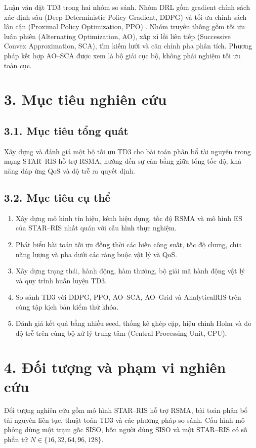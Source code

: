 Luận văn đặt TD3 trong hai nhóm so sánh. Nhóm DRL gồm gradient chính sách xác định sâu (Deep Deterministic Policy Gradient, DDPG) \cite{Lillicrap2015DDPG} và tối ưu chính sách lân cận (Proximal Policy Optimization, PPO) \cite{Meng2024PPOSTARRSMA}. Nhóm truyền thống gồm tối ưu luân phiên (Alternating Optimization, AO), xấp xỉ lồi liên tiếp (Successive Convex Approximation, SCA), tìm kiếm lưới và căn chỉnh pha phân tích. Phương pháp kết hợp AO--SCA được xem là bộ giải cục bộ, không phải nghiệm tối ưu toàn cục.

\section*{3. Mục tiêu nghiên cứu}
\subsection*{3.1. Mục tiêu tổng quát}
Xây dựng và đánh giá một bộ tối ưu TD3 cho bài toán phân bổ tài nguyên trong mạng STAR--RIS hỗ trợ RSMA, hướng đến sự cân bằng giữa tổng tốc độ, khả năng đáp ứng QoS và độ trễ ra quyết định.

\subsection*{3.2. Mục tiêu cụ thể}
\begin{enumerate}[label=\arabic*)]
  \item Xây dựng mô hình tín hiệu, kênh hiệu dụng, tốc độ RSMA và mô hình ES của STAR--RIS nhất quán với cấu hình thực nghiệm.
  \item Phát biểu bài toán tối ưu đồng thời các biến công suất, tốc độ chung, chia năng lượng và pha dưới các ràng buộc vật lý và QoS.
  \item Xây dựng trạng thái, hành động, hàm thưởng, bộ giải mã hành động vật lý và quy trình huấn luyện TD3.
  \item So sánh TD3 với DDPG, PPO, AO--SCA, AO--Grid và AnalyticalRIS trên cùng tập kịch bản kiểm thử khóa.
  \item Đánh giá kết quả bằng nhiều seed, thống kê ghép cặp, hiệu chỉnh Holm và đo độ trễ trên cùng bộ xử lý trung tâm (Central Processing Unit, CPU).
\end{enumerate}

\section*{4. Đối tượng và phạm vi nghiên cứu}
Đối tượng nghiên cứu gồm mô hình STAR--RIS hỗ trợ RSMA, bài toán phân bổ tài nguyên liên tục, thuật toán TD3 và các phương pháp so sánh. Cấu hình mô phỏng dùng một trạm gốc SISO, bốn người dùng SISO và một STAR--RIS có số phần tử $N\in\{16,32,64,96,128\}$.

